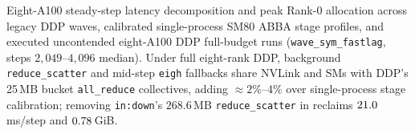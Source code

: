 \begin{table}[t]
\centering
\caption{Eight-A100 steady-step latency decomposition and peak Rank-0 allocation
across legacy DDP waves, calibrated single-process SM80 ABBA stage profiles, and
executed uncontended eight-A100 DDP full-budget runs (\texttt{wave\_sym\_fastlag},
steps $2{,}049$--$4{,}096$ median). Under full eight-rank DDP, background
\texttt{reduce\_scatter} and mid-step \texttt{eigh} fallbacks share NVLink and
SMs with DDP's 25\,MB bucket \texttt{all\_reduce} collectives, adding
$\approx 2\%$--$4\%$ over single-process stage calibration; removing
\texttt{in:down}'s $268.6$\,MB \texttt{reduce\_scatter} in 
reclaims $\sysExecSymLagSavedMlpLagMs$\,ms/step and $\sysExecSymLagSavedMlpLagGib$\,GiB.}
\label{tab:systems}
\scriptsize\setlength{\tabcolsep}{3.8pt}
\resizebox{\textwidth}{!}{}
\end{table}

